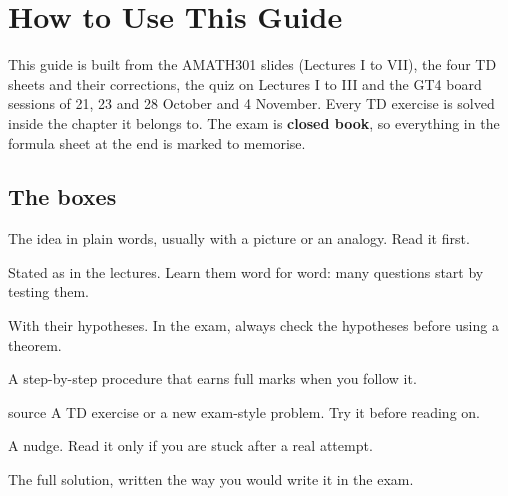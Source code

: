 \chapter*{How to Use This Guide}

This guide is built from the AMATH301 slides (Lectures I to VII), the four TD sheets and their
corrections, the quiz on Lectures I to III and the GT4 board sessions of 21, 23 and 28 October
and 4 November. Every TD exercise is solved inside the chapter it belongs to. The exam is
\textbf{closed book}, so everything in the formula sheet at the end is marked to memorise.

\section*{The boxes}

\begin{intuition}
The idea in plain words, usually with a picture or an analogy. Read it first.
\end{intuition}

{\renewcommand{\thedefi}{}\renewcommand{\thethm}{}\renewcommand{\theprob}{}
\begin{defi}
Stated as in the lectures. Learn them word for word: many questions start by testing them.
\end{defi}

\begin{thm}
With their hypotheses. In the exam, always check the hypotheses before using a theorem.
\end{thm}

\begin{method}
A step-by-step procedure that earns full marks when you follow it.
\end{method}

\begin{problem}{source}
A TD exercise or a new exam-style problem. Try it before reading on.
\end{problem}
\setcounter{prob}{0}
\begin{hint}A nudge. Read it only if you are stuck after a real attempt.\end{hint}
\begin{solution}The full solution, written the way you would write it in the exam.\end{solution}
}\setcounter{defi}{0}\setcounter{thm}{0}

